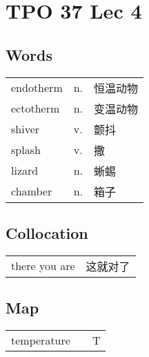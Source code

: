 \section{TPO 37 Lec 4}

\subsection{Words}

\begin{tabular}{lll}
    endotherm & n. & 恒温动物 \\
    ectotherm & n. & 变温动物 \\
    shiver    & v. & 颤抖   \\
    splash    & v. & 撒    \\
    lizard    & n. & 蜥蜴   \\
    chamber   & n. & 箱子   \\
\end{tabular}

\subsection{Collocation}

\begin{tabular}{ll}
    there you are & 这就对了 \\
\end{tabular}

\subsection{Map}

\begin{tabular}{rc@{\quad$\to$\quad}l}
    temperature &  & T \\
\end{tabular}
